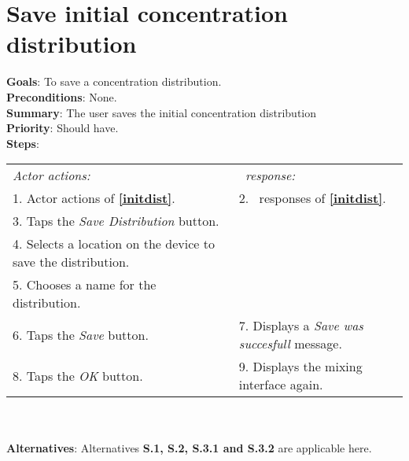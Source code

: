   \section{Save initial concentration distribution}
  \label{savedist}
  \textbf{Goals}: To save a concentration distribution.\\
  \textbf{Preconditions}: None. \\ %
  \textbf{Summary}: The user saves the initial concentration distribution\\
  \textbf{Priority}: Should have.\\
  \textbf{Steps}: \\
  \begin{tabular}{ p{} p{} }
  	\emph{Actor actions:} & \emph{\projectname\ response:} \\
  	1. Actor actions of \textbf{\ref{initdist}}. & 2. \projectname\ responses of \textbf{\ref{initdist}}. \\
    3. Taps the \emph{Save Distribution} button.  & \\
    4. Selects a location on the device to save the distribution. & \\
    5. Chooses a name for the distribution. & \\
    6. Taps the \emph{Save} button. & 7. Displays a \emph{Save was succesfull} message.\\
    8. Taps the \emph{OK} button. & 9. Displays the mixing interface again. \\
    \end{tabular}
    	 \\
    \\\textbf{Alternatives}: Alternatives \textbf{S.1, S.2, S.3.1 and S.3.2} are applicable here.

